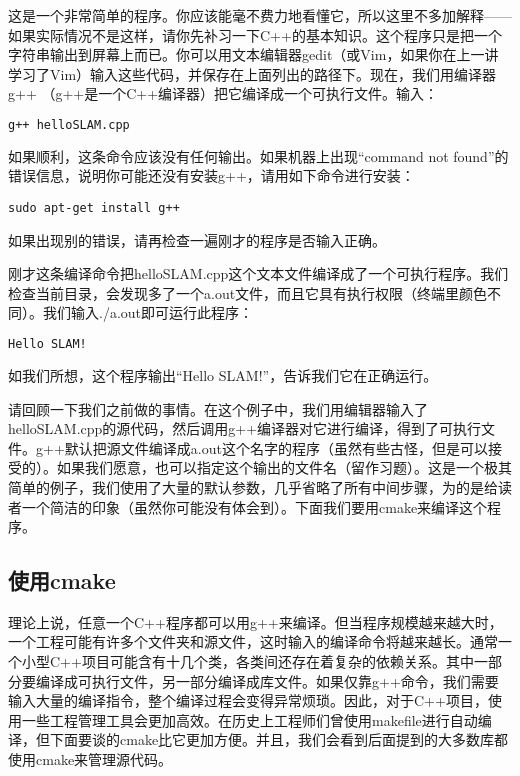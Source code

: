 这是一个非常简单的程序。你应该能毫不费力地看懂它，所以这里不多加解释——如果实际情况不是这样，请你先补习一下C++的基本知识。这个程序只是把一个字符串输出到屏幕上而已。你可以用文本编辑器gedit（或Vim，如果你在上一讲学习了Vim）输入这些代码，并保存在上面列出的路径下。现在，我们用编译器 g++ （g++是一个C++编译器）把它编译成一个可执行文件。输入：

\begin{lstlisting}[language=sh]
g++ helloSLAM.cpp
\end{lstlisting}

如果顺利，这条命令应该没有任何输出。如果机器上出现“command not found”的错误信息，说明你可能还没有安装g++，请用如下命令进行安装：
\begin{lstlisting}
sudo apt-get install g++
\end{lstlisting}
如果出现别的错误，请再检查一遍刚才的程序是否输入正确。

刚才这条编译命令把helloSLAM.cpp这个文本文件编译成了一个可执行程序。我们检查当前目录，会发现多了一个a.out文件，而且它具有执行权限（终端里颜色不同）。我们输入./a.out即可运行此程序：

\begin{lstlisting}[language=sh]
% ./a.out
Hello SLAM!
\end{lstlisting}

如我们所想，这个程序输出“Hello SLAM!”，告诉我们它在正确运行。

请回顾一下我们之前做的事情。在这个例子中，我们用编辑器输入了helloSLAM.cpp的源代码，然后调用g++编译器对它进行编译，得到了可执行文件。g++默认把源文件编译成a.out这个名字的程序（虽然有些古怪，但是可以接受的）。如果我们愿意，也可以指定这个输出的文件名（留作习题）。这是一个极其简单的例子，我们使用了大量的默认参数，几乎省略了所有中间步骤，为的是给读者一个简洁的印象（虽然你可能没有体会到）。下面我们要用cmake来编译这个程序。

\subsection{使用cmake}
理论上说，任意一个C++程序都可以用g++来编译。但当程序规模越来越大时，一个工程可能有许多个文件夹和源文件，这时输入的编译命令将越来越长。通常一个小型C++项目可能含有十几个类，各类间还存在着复杂的依赖关系。其中一部分要编译成可执行文件，另一部分编译成库文件。如果仅靠g++命令，我们需要输入大量的编译指令，整个编译过程会变得异常烦琐。因此，对于C++项目，使用一些工程管理工具会更加高效。在历史上工程师们曾使用makefile进行自动编译，但下面要谈的cmake比它更加方便。并且，我们会看到后面提到的大多数库都使用cmake来管理源代码。

